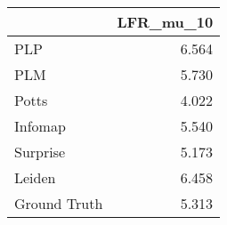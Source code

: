 \begin{tabular}{lr}
\toprule
{} & LFR_mu_10 \\
\midrule
PLP          &     6.564 \\
PLM          &     5.730 \\
Potts        &     4.022 \\
Infomap      &     5.540 \\
Surprise     &     5.173 \\
Leiden       &     6.458 \\
Ground Truth &     5.313 \\
\bottomrule
\end{tabular}
